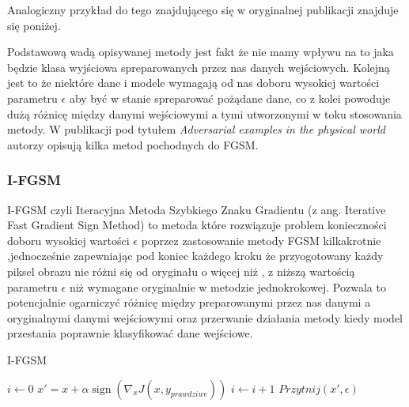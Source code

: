 \documentclass{article}
\begin{document}
    Analogiczny przykład do tego znajdującego się w oryginalnej publikacji\cite{harnessing} znajduje się poniżej.

    Podstawową wadą opisywanej metody jest fakt że nie mamy wpływu na to jaka będzie klasa wyjściowa
    spreparowanych przez nas danych wejściowych. Kolejną jest to że niektóre dane i modele wymagają od nas
    doboru wysokiej wartości parametru $\epsilon$ aby być w stanie spreparować pożądane dane, co z kolei powoduje dużą
    różnicę między danymi wejściowymi a tymi utworzonymi w toku stosowania metody.
    W publikacji pod tytułem \textit{Adversarial examples in the physical world}\cite{DBLP:journals/corr/KurakinGB16}
    autorzy opisują kilka metod pochodnych do FGSM.

    \subsubsection{I-FGSM}
    I-FGSM czyli Iteracyjna Metoda Szybkiego Znaku Gradientu (z ang. Iterative Fast Gradient Sign Method) to metoda
    które rozwiązuje problem konieczności doboru wysokiej wartości $\epsilon$ poprzez zastosowanie metody FGSM kilkakrotnie
    ,jednocześnie zapewniając pod koniec każdego kroku że przyogotowany każdy piksel obrazu nie różni się od oryginału o więcej
    niż \epsilon, z niższą wartością parametru $\epsilon$ niż wymagane oryginalnie w metodzie jednokrokowej.
    Pozwala to  potencjalnie ogarniczyć różnicę między preparowanymi przez nas danymi a oryginalnymi danymi wejściowymi
    oraz przerwanie działania metody kiedy model przestania poprawnie klasyfikować dane wejściowe.

    \begin{algorithm}
    \caption{I-FGSM}\label{IFGSM}
    \begin{algorithmic}[1]
    \State $i \gets 0$
        \State $x' = x + \alpha\operatorname{sign}(\nabla_{x} J(x, y_{prawdziwe}))$
        \State $i \gets i+1$
        \State $Przytnij(x', \epsilon)$
    \EndWhile
    \end{algorithmic}
    \end{algorithm}
\end{document}
